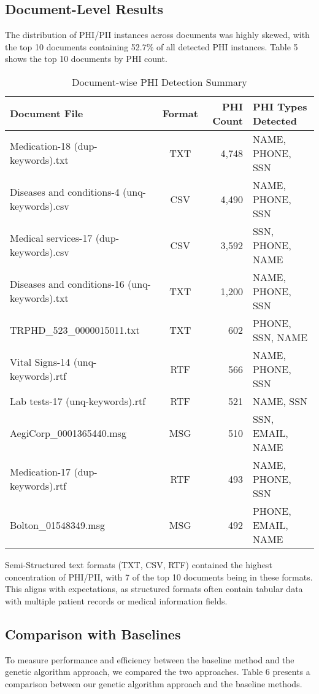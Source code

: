 \documentclass[conference]{IEEEtran}
\begin{document}
\subsection{\textbf{Document-Level Results}}
The distribution of PHI/PII instances across documents was highly skewed, with the top 10 documents containing 52.7\% of all detected PHI instances. Table 5 shows the top 10 documents by PHI count.


\begin{table*}[htbp]
\caption{Document-wise PHI Detection Summary}
\centering
\renewcommand{\arraystretch}{2.5}
\begin{tabular}{|l|c|r|l|}
\hline
\textbf{Document File} & \textbf{Format} & \textbf{PHI Count} & \textbf{PHI Types Detected} \\
\hline
Medication-18 (dup-keywords).txt & TXT & 4,748 & NAME, PHONE, SSN \\
Diseases and conditions-4 (unq-keywords).csv & CSV & 4,490 & NAME, PHONE, SSN \\
Medical services-17 (dup-keywords).csv & CSV & 3,592 & SSN, PHONE, NAME \\
Diseases and conditions-16 (unq-keywords).txt & TXT & 1,200 & NAME, PHONE, SSN \\
TRPHD\_523\_0000015011.txt & TXT & 602 & PHONE, SSN, NAME \\
Vital Signs-14 (unq-keywords).rtf & RTF & 566 & NAME, PHONE, SSN \\
Lab tests-17 (unq-keywords).rtf & RTF & 521 & NAME, SSN \\
AegiCorp\_0001365440.msg & MSG & 510 & SSN, EMAIL, NAME \\
Medication-17 (dup-keywords).rtf & RTF & 493 & NAME, PHONE, SSN \\
Bolton\_01548349.msg & MSG & 492 & PHONE, EMAIL, NAME \\
\hline
\end{tabular}
\label{tab:docwise-phi}
\end{table*}

Semi-Structured text formats (TXT, CSV, RTF) contained the highest concentration of PHI/PII, with 7 of the top 10 documents being in these formats. This aligns with expectations, as structured formats often contain tabular data with multiple patient records or medical information fields.

\subsection{\textbf{Comparison with Baselines}}
To measure performance and efficiency between the baseline method and the genetic algorithm approach, we compared the two approaches.
Table 6 presents a comparison between our genetic algorithm approach and the baseline methods.
\end{document}
